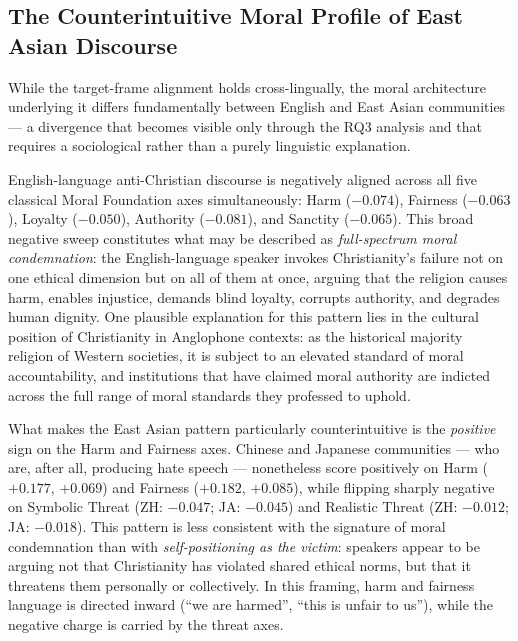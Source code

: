 \documentclass[../CLthesis.tex]{subfiles}
\begin{document}
\subsection{The Counterintuitive Moral Profile of East Asian Discourse}
\label{sec:discussion-moral-inversion}

While the target-frame alignment holds cross-lingually, the moral architecture underlying it differs fundamentally between English and East Asian communities --- a divergence that becomes visible only through the RQ3 analysis and that requires a sociological rather than a purely linguistic explanation.

English-language anti-Christian discourse is negatively aligned across all five classical Moral Foundation axes simultaneously: Harm ($-0.074$), Fairness ($-0.063$), Loyalty ($-0.050$), Authority ($-0.081$), and Sanctity ($-0.065$). This broad negative sweep constitutes what may be described as \emph{full-spectrum moral condemnation}: the English-language speaker invokes Christianity's failure not on one ethical dimension but on all of them at once, arguing that the religion causes harm, enables injustice, demands blind loyalty, corrupts authority, and degrades human dignity. One plausible explanation for this pattern lies in the cultural position of Christianity in Anglophone contexts: as the historical majority religion of Western societies, it is subject to an elevated standard of moral accountability, and institutions that have claimed moral authority are indicted across the full range of moral standards they professed to uphold.

What makes the East Asian pattern particularly counterintuitive is the \emph{positive} sign on the Harm and Fairness axes. Chinese and Japanese communities --- who are, after all, producing hate speech --- nonetheless score positively on Harm ($+0.177$, $+0.069$) and Fairness ($+0.182$, $+0.085$), while flipping sharply negative on Symbolic Threat (ZH: $-0.047$; JA: $-0.045$) and Realistic Threat (ZH: $-0.012$; JA: $-0.018$). This pattern is less consistent with the signature of moral condemnation than with \emph{self-positioning as the victim}: speakers appear to be arguing not that Christianity has violated shared ethical norms, but that it threatens them personally or collectively. In this framing, harm and fairness language is directed inward (``we are harmed'', ``this is unfair to us''), while the negative charge is carried by the threat axes.
\end{document}
